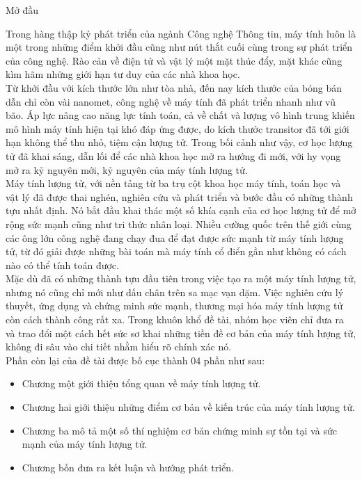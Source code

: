\begin{preface}{Mở đầu}
 
Trong hàng thập kỷ phát triển của ngành Công nghệ Thông tin, máy tính luôn là một trong những điểm khởi đầu cũng như nút thắt cuối cùng trong sự phát triển của công nghệ. Rào cản về điện tử và vật lý một mặt thúc đẩy, mặt khác cũng kìm hãm những giới hạn tư duy của các nhà khoa học.\\
\indent
Từ khởi đầu với kích thước lớn như tòa nhà, đến nay kích thước của bóng bán dẫn chỉ còn vài nanomet, công nghệ về máy tính đã phát triển nhanh như vũ bão. Áp lực nâng cao năng lực tính toán, cả về chất và lượng vô hình trung khiến mô hình máy tính hiện tại khó đáp ứng được, do kích thước transitor đã tới giới hạn không thể thu nhỏ, tiệm cận lượng tử. Trong bối cảnh như vậy, cơ học lượng tử đã khai sáng, dẫn lối để các nhà khoa học mở ra hướng đi mới, với hy vọng mở ra kỷ nguyên mới, kỷ nguyên của máy tính lượng tử.\\
\indent
Máy tính lượng tử, với nền tảng từ ba trụ cột khoa học máy tính, toán học và vật lý đã được thai nghén, nghiên cứu và phát triển và bước đầu có những thành tựu nhất định. Nó bắt đầu khai thác một số khía cạnh của cơ học lượng tử để mở rộng sức mạnh cũng như tri thức nhân loại. Nhiều cường quốc trên thế giới cùng các ông lớn công nghệ đang chạy đua để đạt được sức mạnh từ máy tính lượng tử, từ đó giải được những bài toán mà máy tính cổ điển gần như không có cách nào có thể tính toán được.\\
\indent
Mặc dù đã có những thành tựu đầu tiên trong việc tạo ra một máy tính lượng tử, nhưng nó cũng chỉ mới như dấu chân trên sa mạc vạn dặm. Việc nghiên cứu lý thuyết, ứng dụng và chứng minh sức mạnh, thương mại hóa máy tính lượng tử còn cách thành công rất xa. Trong khuôn khổ đề tài, nhóm học viên chỉ đưa ra và trao đổi một cách hết sức sơ khai những tiền đề cơ bản của máy tính lượng tử, không đi sâu vào chi tiết nhằm hiểu rõ chính xác nó. \\
\indent
Phần còn lại của đề tài được bố cục thành 04 phần như sau:
    \begin{itemize}
        \item Chương một giới thiệu tổng quan về máy tính lượng tử. 
        \item Chương hai giới thiệu những điểm cơ bản về kiến trúc của máy tính lượng tử. 
        \item Chương ba mô tả một số thí nghiệm cơ bản chứng minh sự tồn tại và sức mạnh của máy tính lượng tử. 
        \item Chương bốn đưa ra kết luận và hướng phát triển.
    \end{itemize}
\end{preface}
